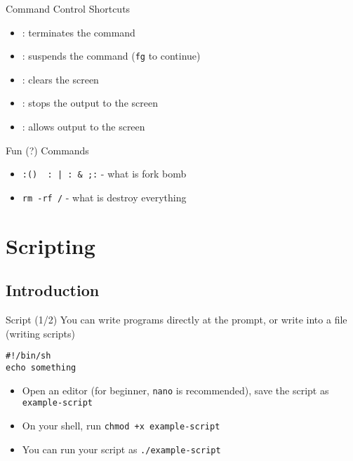 \documentclass[12pt]{beamer}
\begin{document}
\begin{frame}{Command Control Shortcuts}
  \begin{itemize}
    \item {}: terminates the command
    \item {}: suspends the command (\texttt{fg} to continue)
    \item {}: clears the screen
    \item {}: stops the output to the screen
    \item {}: allows output to the screen
  \end{itemize}
\end{frame}

\begin{frame}{Fun (?) Commands}
    \begin{itemize}
        \item \texttt{:() { : | : & };:} - what is fork bomb
        \item \texttt{rm -rf /} - what is destroy everything
    \end{itemize}
\end{frame}
\section{Scripting}
\subsection{Introduction}

\begin{frame}[fragile]{Script (1/2)}
  You can write programs directly at the prompt, or write into a file (writing scripts)
  \begin{verbatim}
#!/bin/sh
echo something
\end{verbatim}
  \begin{itemize}
    \item Open an editor (for beginner, \texttt{nano} is recommended), save the script as \texttt{example-script}
    \item On your shell, run \texttt{chmod +x example-script}
    \item You can run your script as \texttt{./example-script}
  \end{itemize}
\end{frame}
\end{document}
